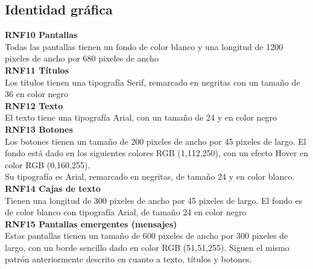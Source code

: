 \subsection{Identidad gráfica}

\textbf{RNF10 \hspace{2cm}Pantallas}\\
Todas las pantallas tienen un fondo de color blanco y una longitud de 1200 pixeles de ancho por 680 pixeles de ancho\\

\textbf{RNF11 \hspace{2cm}Títulos}\\
Los títulos tienen una tipografía Serif, remarcado en negritas con un tamaño de 36 en color negro\\

\textbf{RNF12 \hspace{2cm}Texto}\\
El texto tiene una tipografía Arial, con un tamaño de 24 y en color negro\\

\textbf{RNF13 \hspace{2cm}Botones}\\
Los botones tienen un tamaño de 200 pixeles de ancho por 45 pixeles de largo.
El fondo está dado en los siguientes colores RGB (1,112,250), con un efecto Hover en color RGB (0,160,255).\\
Su tipografía es Arial, remarcado en negritas, de tamaño 24 y en color blanco.\\

\textbf{RNF14 \hspace{2cm}Cajas de texto}\\
Tienen una longitud de 300 pixeles de ancho por 45 pixeles de largo.
El fondo es de color blanco con tipografía Arial, de tamaño 24 en color negro\\

\textbf{RNF15 \hspace{2cm}Pantallas emergentes (mensajes)}\\
Estas pantallas tienen un tamaño de 600 pixeles de ancho por 300 pixeles de largo, con un borde sencillo dado en color RGB (51,51,255). Siguen el mismo patrón anteriormente descrito en cuanto a texto, títulos y botones.\\





